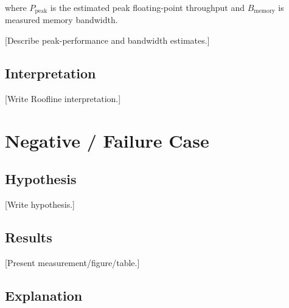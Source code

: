 \documentclass[11pt]{article}
\begin{document}
where $P_{\mathrm{peak}}$ is the estimated peak floating-point
throughput and $B_{\mathrm{memory}}$ is measured memory bandwidth.


[Describe peak-performance and bandwidth estimates.]

\subsection{Interpretation}


[Write Roofline interpretation.]

%

\section{Negative / Failure Case}

\subsection{Hypothesis}


[Write hypothesis.]

\subsection{Results}

[Present measurement/figure/table.]

\subsection{Explanation}
\end{document}
